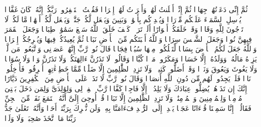 \stopbuffer%
\startbuffer[\q:71:8]
ثُمَّ إِنِّی دَعَوۡتُهُمۡ جِهَارࣰا%
\stopbuffer%
\startbuffer[\q:71:9]
ثُمَّ إِنِّیۤ أَعۡلَنتُ لَهُمۡ وَأَسۡرَرۡتُ لَهُمۡ إِسۡرَارࣰا%
\stopbuffer%
\startbuffer[\q:71:10]
فَقُلۡتُ ٱسۡتَغۡفِرُوا۟ رَبَّكُمۡ إِنَّهُۥ كَانَ غَفَّارࣰا%
\stopbuffer%
\startbuffer[\q:71:11]
یُرۡسِلِ ٱلسَّمَاۤءَ عَلَیۡكُم مِّدۡرَارࣰا%
\stopbuffer%
\startbuffer[\q:71:12]
وَیُمۡدِدۡكُم بِأَمۡوَٰلࣲ وَبَنِینَ وَیَجۡعَل لَّكُمۡ جَنَّٰتࣲ وَیَجۡعَل لَّكُمۡ أَنۡهَٰرࣰا%
\stopbuffer%
\startbuffer[\q:71:13]
مَّا لَكُمۡ لَا تَرۡجُونَ لِلَّهِ وَقَارࣰا%
\stopbuffer%
\startbuffer[\q:71:14]
وَقَدۡ خَلَقَكُمۡ أَطۡوَارًا%
\stopbuffer%
\startbuffer[\q:71:15]
أَلَمۡ تَرَوۡا۟ كَیۡفَ خَلَقَ ٱللَّهُ سَبۡعَ سَمَٰوَٰتࣲ طِبَاقࣰا%
\stopbuffer%
\startbuffer[\q:71:16]
وَجَعَلَ ٱلۡقَمَرَ فِیهِنَّ نُورࣰا وَجَعَلَ ٱلشَّمۡسَ سِرَاجࣰا%
\stopbuffer%
\startbuffer[\q:71:17]
وَٱللَّهُ أَنۢبَتَكُم مِّنَ ٱلۡأَرۡضِ نَبَاتࣰا%
\stopbuffer%
\startbuffer[\q:71:18]
ثُمَّ یُعِیدُكُمۡ فِیهَا وَیُخۡرِجُكُمۡ إِخۡرَاجࣰا%
\stopbuffer%
\startbuffer[\q:71:19]
وَٱللَّهُ جَعَلَ لَكُمُ ٱلۡأَرۡضَ بِسَاطࣰا%
\stopbuffer%
\startbuffer[\q:71:20]
لِّتَسۡلُكُوا۟ مِنۡهَا سُبُلࣰا فِجَاجࣰا%
\stopbuffer%
\startbuffer[\q:71:21]
قَالَ نُوحࣱ رَّبِّ إِنَّهُمۡ عَصَوۡنِی وَٱتَّبَعُوا۟ مَن لَّمۡ یَزِدۡهُ مَالُهُۥ وَوَلَدُهُۥۤ إِلَّا خَسَارࣰا%
\stopbuffer%
\startbuffer[\q:71:22]
وَمَكَرُوا۟ مَكۡرࣰا كُبَّارࣰا%
\stopbuffer%
\startbuffer[\q:71:23]
وَقَالُوا۟ لَا تَذَرُنَّ ءَالِهَتَكُمۡ وَلَا تَذَرُنَّ وَدࣰّا وَلَا سُوَاعࣰا وَلَا یَغُوثَ وَیَعُوقَ وَنَسۡرࣰا%
\stopbuffer%
\startbuffer[\q:71:24]
وَقَدۡ أَضَلُّوا۟ كَثِیرࣰاۖ وَلَا تَزِدِ ٱلظَّٰلِمِینَ إِلَّا ضَلَٰلࣰا%
\stopbuffer%
\startbuffer[\q:71:25]
مِّمَّا خَطِیۤءَٰتِهِمۡ أُغۡرِقُوا۟ فَأُدۡخِلُوا۟ نَارࣰا فَلَمۡ یَجِدُوا۟ لَهُم مِّن دُونِ ٱللَّهِ أَنصَارࣰا%
\stopbuffer%
\startbuffer[\q:71:26]
وَقَالَ نُوحࣱ رَّبِّ لَا تَذَرۡ عَلَى ٱلۡأَرۡضِ مِنَ ٱلۡكَٰفِرِینَ دَیَّارًا%
\stopbuffer%
\startbuffer[\q:71:27]
إِنَّكَ إِن تَذَرۡهُمۡ یُضِلُّوا۟ عِبَادَكَ وَلَا یَلِدُوۤا۟ إِلَّا فَاجِرࣰا كَفَّارࣰا%
\stopbuffer%
\startbuffer[\q:71:28]
رَّبِّ ٱغۡفِرۡ لِی وَلِوَٰلِدَیَّ وَلِمَن دَخَلَ بَیۡتِیَ مُؤۡمِنࣰا وَلِلۡمُؤۡمِنِینَ وَٱلۡمُؤۡمِنَٰتِۖ وَلَا تَزِدِ ٱلظَّٰلِمِینَ إِلَّا تَبَارَۢا%
\stopbuffer%
\startbuffer[\q:72:1]
قُلۡ أُوحِیَ إِلَیَّ أَنَّهُ ٱسۡتَمَعَ نَفَرࣱ مِّنَ ٱلۡجِنِّ فَقَالُوۤا۟ إِنَّا سَمِعۡنَا قُرۡءَانًا عَجَبࣰا%
\stopbuffer%
\startbuffer[\q:72:2]
یَهۡدِیۤ إِلَى ٱلرُّشۡدِ فَءَامَنَّا بِهِۦۖ وَلَن نُّشۡرِكَ بِرَبِّنَاۤ أَحَدࣰا%
\stopbuffer%
\startbuffer[\q:72:3]
وَأَنَّهُۥ تَعَٰلَىٰ جَدُّ رَبِّنَا مَا ٱتَّخَذَ صَٰحِبَةࣰ وَلَا وَلَدࣰا%
\stopbuffer%
